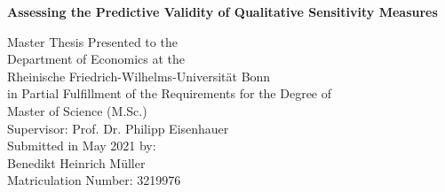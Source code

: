 \begin{titlepage}

\begin{center}

\vspace*{1.0cm}

{\LARGE
\bfseries Assessing the Predictive Validity of Qualitative Sensitivity Measures \\
\vspace*{0.5cm}
}%


{\large
\vspace*{4.0cm}
Master Thesis Presented to the\\
\vspace*{0.25cm}
Department of Economics at the\\
\vspace*{0.25cm}
Rheinische Friedrich-Wilhelms-Universität Bonn\\

\vspace*{2.0cm}
in Partial Fulfillment of the Requirements for the Degree of\\
\vspace*{0.25cm}
Master of Science (M.Sc.)\\

\vspace*{4.0cm}
Supervisor: Prof. Dr. Philipp Eisenhauer\\

\vspace*{2.0cm}
Submitted in May 2021 by:\\
Benedikt Heinrich Müller\\
Matriculation Number: 3219976
}

\end{center}

\end{titlepage}